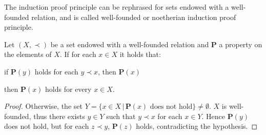 The induction proof principle can be rephrased for sets endowed with a well-founded relation, and is called well-founded or noetherian induction proof principle.
\begin{proposition}
	Let $(X,\prec)$ be a set endowed with a well-founded relation and $\mathbf{P}$ a property on the elements of $X$. If for each $x\in X$ it holds that: 
	\begin{center} if $\mathbf{P}(y)$ holds  for each $y\prec x$, then $\mathbf{P}(x)$\end{center}
	then $\mathbf{P}(x)$ holds for every $x\in X$.
\end{proposition}
\begin{proof}
	Otherwise, the set $Y=\{x\in X\,|\,\mathbf{P}(x)\textrm{ does not hold}\}\neq\emptyset$. $X$ is well-founded, thus there exists $y\in Y$ such that $y\prec x$ for each $x\in Y$. Hence $\mathbf{P}(y)$ does not hold, but for each $z\prec y$, $\mathbf{P}(z)$ holds, contradicting the hypothesis.
\end{proof}

